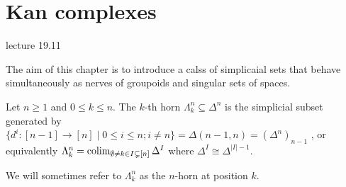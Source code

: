 \section{Kan complexes}

lecture 19.11

The aim of this chapter is to introduce a calss of simplicaial sets that behave simultaneously as nerves of groupoids and singular sets of spaces.

\begin{defi}
    Let $n \geq 1$ and $ 0 \leq k \leq n$.
    The $k$-th horn $\Lambda_k^n \subseteq \Delta^n$ is the simplicial subset generated by $\{ d^i \colon [n-1] \to [n] \mid 0 \leq i \leq n ; i \neq n \} = \Delta ( n-1,n) = (\Delta^n)_{n-1}$ , or equivalently $\Lambda_k^n = \operatorname{colim}_{\emptyset \neq k \in I \subsetneq [n]}\Delta^I$ where $\Delta^I \cong \Delta^{\lvert I \rvert -1}$.
\end{defi}

\begin{rmk}
    We will sometimes refer to $\Lambda_k^n$ as the $n$-horn at position $k$.     
\end{rmk}

\begin{exmp}
\end{exmp}

